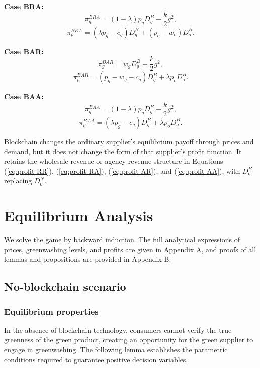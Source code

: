 \documentclass[preprint,review,12pt,authoryear,nopreprintline]{elsarticle}
\theoremstyle{definition}
\begin{document}
\noindent\textbf{Case BRA:}
\begin{equation}
\pi_g^{BRA}=(1-\lambda)p_g D_g^B-\frac{k}{2}g^2,
\end{equation}
\begin{equation}
\pi_p^{BRA}=(\lambda p_g-c_g)D_g^B+(p_o-w_o)D_o^B.
\end{equation}

\noindent\textbf{Case BAR:}
\begin{equation}
\pi_g^{BAR}=w_gD_g^B-\frac{k}{2}g^2,
\end{equation}
\begin{equation}
\pi_p^{BAR}=(p_g-w_g-c_g)D_g^B+\lambda p_oD_o^B.
\end{equation}

\noindent\textbf{Case BAA:}
\begin{equation}
\pi_g^{BAA}=(1-\lambda)p_gD_g^B-\frac{k}{2}g^2,
\end{equation}
\begin{equation}
\pi_p^{BAA}=(\lambda p_g-c_g)D_g^B+\lambda p_oD_o^B.
\end{equation}

Blockchain changes the ordinary supplier's equilibrium payoff through prices and demand, but it does not change the form of that supplier's profit function. It retains the wholesale-revenue or agency-revenue structure in Equations (\ref{eq:profit-RR}), (\ref{eq:profit-RA}), (\ref{eq:profit-AR}), and (\ref{eq:profit-AA}), with $D_o^B$ replacing $D_o^N$.

\section{Equilibrium Analysis}\label{sec:4}

We solve the game by backward induction. The full analytical expressions of prices, greenwashing levels, and profits are given in Appendix A, and proofs of all lemmas and propositions are provided in Appendix B.

\subsection{No-blockchain scenario}

\subsubsection{Equilibrium properties}

In the absence of blockchain technology, consumers cannot verify the true greenness of the green product, creating an opportunity for the green supplier to engage in greenwashing. The following lemma establishes the parametric conditions required to guarantee positive decision variables.
\end{document}
